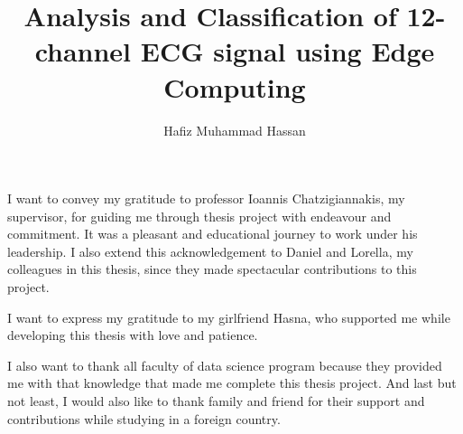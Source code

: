\documentclass[LaM,binding=0.6cm]{sapthesis}
\title{Analysis and Classification of 12-channel ECG signal using Edge Computing}
\author{Hafiz Muhammad Hassan}
\begin{document}
\frontmatter

\maketitle






\begin{acknowledgments}
\parskip=12pt

I want to convey my gratitude to professor Ioannis Chatzigiannakis, my supervisor, for guiding me through thesis project with endeavour and commitment. It was a pleasant and educational journey to work under his leadership. I also extend this acknowledgement to Daniel and Lorella, my colleagues in this thesis, since they made spectacular contributions to this project.

I want to express my gratitude to my girlfriend Hasna, who supported me while developing this thesis with love and patience.

I also want to thank all faculty of data science program because they provided me with that knowledge that made me complete this thesis project. And last but not least, I would also like to thank family and friend for their support and contributions while studying in a foreign country.



\end{acknowledgments}
\newpage 
\let\cleardoublepage

\tableofcontents

\mainmatter

\parskip=5pt













\backmatter
\cleardoublepage
{}
\end{document}
